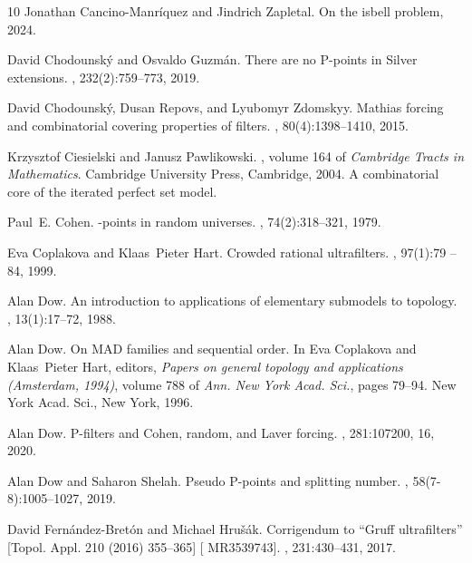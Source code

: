\documentclass{article}%
\begin{document}
\begin{thebibliography}{10}
Jonathan Cancino-Manríquez and Jindrich Zapletal.
\newblock On the isbell problem, 2024.

David Chodounsk\'{y} and Osvaldo Guzm\'{a}n.
\newblock There are no {P}-points in {S}ilver extensions.
, 232(2):759--773, 2019.

David Chodounsk\'y, Dusan Repovs, and Lyubomyr Zdomskyy.
\newblock Mathias forcing and combinatorial covering properties of filters.
, 80(4):1398--1410, 2015.

Krzysztof Ciesielski and Janusz Pawlikowski.
, volume 164 of {\em
  Cambridge Tracts in Mathematics}.
\newblock Cambridge University Press, Cambridge, 2004.
\newblock A combinatorial core of the iterated perfect set model.

Paul~E. Cohen.
-points in random universes.
, 74(2):318--321, 1979.

Eva Coplakova and Klaas~Pieter Hart.
\newblock Crowded rational ultrafilters.
, 97(1):79 -- 84, 1999.

Alan Dow.
\newblock An introduction to applications of elementary submodels to topology.
, 13(1):17--72, 1988.

Alan Dow.
\newblock On {MAD} families and sequential order.
\newblock In Eva Coplakova and Klaas~Pieter Hart, editors, {\em Papers on
  general topology and applications ({A}msterdam, 1994)}, volume 788 of {\em
  Ann. New York Acad. Sci.}, pages 79--94. New York Acad. Sci., New York, 1996.

Alan Dow.
\newblock P-filters and {C}ohen, random, and {L}aver forcing.
, 281:107200, 16, 2020.

Alan Dow and Saharon Shelah.
\newblock Pseudo {P}-points and splitting number.
, 58(7-8):1005--1027, 2019.

David Fern\'{a}ndez-Bret\'{o}n and Michael Hru\v{s}\'{a}k.
\newblock Corrigendum to ``{G}ruff ultrafilters'' [{T}opol. {A}ppl. 210 (2016)
  355--365] [ {MR}3539743].
, 231:430--431, 2017.


\end{thebibliography}
\end{document}
